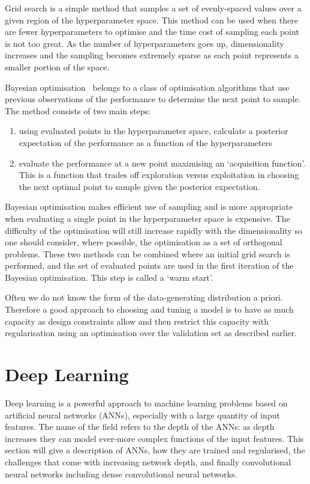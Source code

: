 Grid search is a simple method that samples a set of evenly-spaced values over a given region of the hyperparameter space. 
This method can be used when there are fewer hyperparameters to optimise and the time cost of sampling each point is not too great. 
As the number of hyperparameters goes up, dimensionality increases and the sampling becomes extremely sparse as each point represents a smaller portion of the space.

Bayesian optimisation~\cite{BayesOpt} belongs to a class of optimisation algorithms that use previous observations of the performance to determine the next point to sample. 
The method consists of two main steps:
\begin{enumerate}[noitemsep]
    \item using evaluated points in the hyperparameter space, calculate a posterior expectation of the performance as a function of the hyperparameters
    \item evaluate the performance at a new point maximising an `acquisition function'. This is a function that trades off exploration versus exploitation in choosing the next optimal point to sample given the posterior expectation.
\end{enumerate}
Bayesian optimisation makes efficient use of sampling and is more appropriate when evaluating a single point in the hyperparameter space is expensive. The difficulty of the optimisation will still increase rapidly with the dimensionality so one should consider, where possible, the optimisation as a set of orthogonal problems.  
These two methods can be combined where an initial grid search is performed, and the set of evaluated points are used in the first iteration of the Bayesian optimisation. 
This step is called a `warm start'. 

Often we do not know the form of the data-generating distribution a priori. Therefore a good approach to choosing and tuning a model is to have as much capacity as design constraints allow and then restrict this capacity with regularisation using an optimisation over the validation set as described earlier.

\section{Deep Learning}
Deep learning is a powerful approach to machine learning problems based on artificial neural networks (ANNs), especially with a large quantity of input features. 
The name of the field refers to the depth of the ANNs: as depth increases they can model ever-more complex functions of the input features. 
This section will give a description of ANNs, how they are trained and regularised, the challenges that come with increasing network depth, and finally convolutional neural networks including dense convolutional neural networks.  

